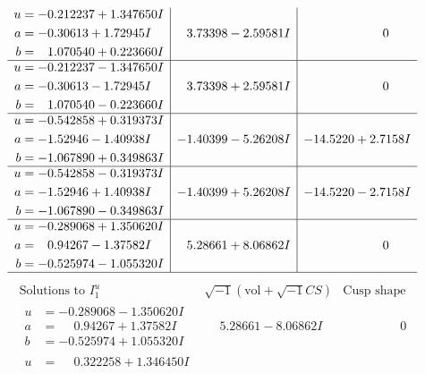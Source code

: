 \documentclass[1p]{elsarticle_modified}
\theoremstyle{definition}
\newcommand{\I}{\sqrt{-1}}
\begin{document}
$$\begin{array}{c|c|c}
\begin{aligned}
u &= -0.212237 + 1.347650 I \\
a &= -0.30613 + 1.72945 I \\
b &= \phantom{-}1.070540 + 0.223660 I\end{aligned}
 & \phantom{-}3.73398 - 2.59581 I & \phantom{-0.000000 } 0 \\ \hline\begin{aligned}
u &= -0.212237 - 1.347650 I \\
a &= -0.30613 - 1.72945 I \\
b &= \phantom{-}1.070540 - 0.223660 I\end{aligned}
 & \phantom{-}3.73398 + 2.59581 I & \phantom{-0.000000 } 0 \\ \hline\begin{aligned}
u &= -0.542858 + 0.319373 I \\
a &= -1.52946 - 1.40938 I \\
b &= -1.067890 + 0.349863 I\end{aligned}
 & -1.40399 - 5.26208 I & -14.5220 + 2.7158 I \\ \hline\begin{aligned}
u &= -0.542858 - 0.319373 I \\
a &= -1.52946 + 1.40938 I \\
b &= -1.067890 - 0.349863 I\end{aligned}
 & -1.40399 + 5.26208 I & -14.5220 - 2.7158 I \\ \hline\begin{aligned}
u &= -0.289068 + 1.350620 I \\
a &= \phantom{-}0.94267 - 1.37582 I \\
b &= -0.525974 - 1.055320 I\end{aligned}
 & \phantom{-}5.28661 + 8.06862 I & \phantom{-0.000000 } 0\\
 \hline 
 \end{array}$$\newpage$$\begin{array}{c|c|c}  
\text{Solutions to }I^u_{1}& \I (\text{vol} + \sqrt{-1}CS) & \text{Cusp shape}\\
 \hline 
\begin{aligned}
u &= -0.289068 - 1.350620 I \\
a &= \phantom{-}0.94267 + 1.37582 I \\
b &= -0.525974 + 1.055320 I\end{aligned}
 & \phantom{-}5.28661 - 8.06862 I & \phantom{-0.000000 } 0 \\ \hline\begin{aligned}
u &= \phantom{-}0.322258 + 1.346450 I \\

\end{aligned}
\end{array}$$
\end{document}
